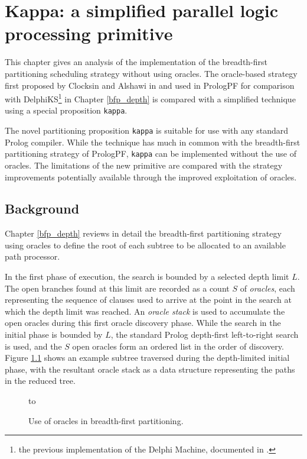 \chapter[Kappa]{Kappa: a simplified parallel logic processing primitive}
\label{kappa}

This chapter gives an analysis of the implementation of the
breadth-first partitioning scheduling strategy without using
oracles.  The oracle-based strategy 
first proposed by Clocksin and Alshawi in \cite{CA87} and
used in PrologPF for comparison with DelphiKS\footnote{the previous
implementation of the Delphi Machine,
documented in \cite{Kle91, Sar95}.} in Chapter \ref{bfp_depth}
is compared with a
simplified technique using a special proposition \texttt{kappa}.

The novel partitioning proposition \texttt{kappa} is suitable
for use with any standard Prolog compiler.  While
the technique has much in common with
the breadth-first partitioning strategy of
PrologPF, \texttt{kappa} can be implemented without the use of oracles.
The limitations of the new primitive are compared with
the strategy improvements
potentially available through the improved
exploitation of oracles.


\section{Background} %

Chapter \ref{bfp_depth} reviews in detail the breadth-first
partitioning strategy using oracles to define the root of each
subtree to be allocated to an available path processor.

In the first phase of execution, the search is bounded by a
selected depth limit $L$.  The open branches found at this limit
are recorded as a count $S$ of \textit{oracles}, each representing the
sequence of clauses used to arrive at the point in the search at which
the depth limit was reached.  An \textit{oracle stack} is used to
accumulate the open oracles during this first oracle discovery phase.
While the search in the initial phase is bounded by $L$,
the standard Prolog depth-first left-to-right search is used, and
the $S$ open oracles form an ordered list in the order
of discovery.  Figure \ref{kappa_bfp} shows an example subtree traversed
during the depth-limited initial phase, with the resultant oracle
stack as a data structure representing the paths in the reduced tree.

\begin{figure}[htbp]
\vspace{5mm} \hbox to 
\caption{Use of oracles in breadth-first partitioning.}
\vspace{5mm}
\label{kappa_bfp}
\end{figure}

